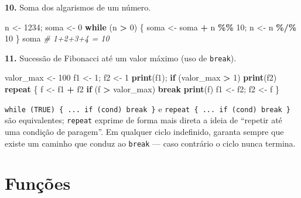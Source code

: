 \documentclass[
  portuguese,
  11pt,
  openany]{book}
\newenvironment{Shaded}{\begin{snugshade}}{\end{snugshade}}
\newcommand{\CommentTok}[1]{\textcolor[rgb]{0.56,0.35,0.01}{\textit{#1}}}
\newcommand{\ControlFlowTok}[1]{\textcolor[rgb]{0.13,0.29,0.53}{\textbf{#1}}}
\newcommand{\DecValTok}[1]{\textcolor[rgb]{0.00,0.00,0.81}{#1}}
\newcommand{\FunctionTok}[1]{\textcolor[rgb]{0.13,0.29,0.53}{\textbf{#1}}}
\newcommand{\NormalTok}[1]{#1}
\newcommand{\OtherTok}[1]{\textcolor[rgb]{0.56,0.35,0.01}{#1}}
\newcommand{\SpecialCharTok}[1]{\textcolor[rgb]{0.81,0.36,0.00}{\textbf{#1}}}
\begin{document}
\textbf{10.} Soma dos algarismos de um número.

\begin{Shaded}
\begin{Highlighting}[]
\NormalTok{n }\OtherTok{\textless{}{-}} \DecValTok{1234}\NormalTok{; soma }\OtherTok{\textless{}{-}} \DecValTok{0}
\ControlFlowTok{while}\NormalTok{ (n }\SpecialCharTok{\textgreater{}} \DecValTok{0}\NormalTok{) \{ soma }\OtherTok{\textless{}{-}}\NormalTok{ soma }\SpecialCharTok{+}\NormalTok{ n }\SpecialCharTok{\%\%} \DecValTok{10}\NormalTok{; n }\OtherTok{\textless{}{-}}\NormalTok{ n }\SpecialCharTok{\%/\%} \DecValTok{10}\NormalTok{ \}}
\NormalTok{soma                       }\CommentTok{\# 1+2+3+4 = 10}
\end{Highlighting}
\end{Shaded}

\textbf{11.} Sucessão de Fibonacci até um valor máximo (uso de \texttt{break}).

\begin{Shaded}
\begin{Highlighting}[]
\NormalTok{valor\_max }\OtherTok{\textless{}{-}} \DecValTok{100}
\NormalTok{f1 }\OtherTok{\textless{}{-}} \DecValTok{1}\NormalTok{; f2 }\OtherTok{\textless{}{-}} \DecValTok{1}
\FunctionTok{print}\NormalTok{(f1); }\ControlFlowTok{if}\NormalTok{ (valor\_max }\SpecialCharTok{\textgreater{}} \DecValTok{1}\NormalTok{) }\FunctionTok{print}\NormalTok{(f2)}
\ControlFlowTok{repeat}\NormalTok{ \{}
\NormalTok{  f }\OtherTok{\textless{}{-}}\NormalTok{ f1 }\SpecialCharTok{+}\NormalTok{ f2}
  \ControlFlowTok{if}\NormalTok{ (f }\SpecialCharTok{\textgreater{}}\NormalTok{ valor\_max) }\ControlFlowTok{break}
  \FunctionTok{print}\NormalTok{(f)}
\NormalTok{  f1 }\OtherTok{\textless{}{-}}\NormalTok{ f2; f2 }\OtherTok{\textless{}{-}}\NormalTok{ f}
\NormalTok{\}}
\end{Highlighting}
\end{Shaded}

\texttt{while\ (TRUE)\ \{\ ...\ if\ (cond)\ break\ \}} e \texttt{repeat\ \{\ ...\ if\ (cond)\ break\ \}} são
equivalentes; \texttt{repeat} exprime de forma mais direta a ideia de ``repetir até uma
condição de paragem''. Em qualquer ciclo indefinido, garanta sempre que existe um
caminho que conduz ao \texttt{break} --- caso contrário o ciclo nunca termina.

\section{Funções}\label{funuxe7uxf5es}
\end{document}
